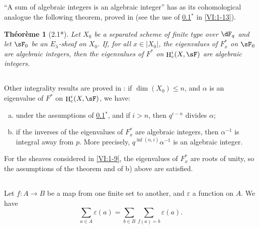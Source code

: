 \documentclass[oneside]{book}
\DeclareMathOperator{\h}{H}
\theoremstyle{sga-source}
\theoremstyle{sga-source-dash}
\theoremstyle{sga-source-dotdash}
\theoremstyle{sga-source-number-note-dash}
\theoremstyle{sga-source-note-number-dotdash}
\theoremstyle{sga-source-example-dotdash}
\theoremstyle{sga-source-inline-number}
\theoremstyle{sga-source-bare-number}
\theoremstyle{sga-source}
\newtheorem*{theorem*}{Théorème}
\begin{document}
\subsection{}\label{VI:2-1}

``A sum of algebraic integers is an algebraic integer'' has as its 
cohomological analogue the following theorem, proved in 
\cite[XXI 5.2.2]{sga7} (see the use of \ref{VI:2-1}$^\ast$ in 
\ref{VI:1-13}). 





\begin{theorem*}[2.1*]\label{VI:2-1*}
Let $X_0$ be a separated scheme of finite type over $\dF_q$ and let $\sF_0$ be an 
$E_\lambda$-sheaf on $X_0$. If, for all $x\in |X_0|$, the 
eigenvalues of $F_x^\ast$ on $\sF_0$ are algebraic integers, then the 
eigenvalues of $F^\ast$ on $\h_c^i(X,\sF)$ are algebraic integers. 
\end{theorem*}





\subsection{}\label{VI:2-2}

Other integrality results are proved in 
\cite[XXI, 5.2.2 et 5.4]{sga7}: if $\dim(X_0)\leqslant n$, and $\alpha$ is 
an eigenvalue of $F^\ast$ on $\h_c^i(X,\sF)$, we have: 
\begin{enumerate}[a)]
  \item under the assumptions of \ref{VI:2-1}$^\ast$, and if $i>n$, then 
    $q^{i-n}$ divides $\alpha$;
  \item if the inverses of the eigenvalues of $F_x^\ast$ are algebraic 
    integers, then $\alpha^{-1}$ is integral away from $p$. More 
    precisely, $q^{\inf(n,i)}\alpha^{-1}$ is an algebraic integer. 
\end{enumerate}

For the sheaves considered in \ref{VI:1-9}, the eigenvalues of 
$F_x^\ast$ are roots of unity, so the assumptions of 
the theorem and of b) above are satisfied. 





\subsection{}\label{VI:2-3}

Let $f:A\to B$ be a map from one finite set to another, and 
$\varepsilon$ a function on $A$. We have 
\begin{equation*}\tag{2.3.1}\label{VI:eq:2-3-1}
  \sum_{a\in A} \varepsilon(a) = \sum_{b\in B} \sum_{f(a)=b} \varepsilon(a) \text{.}
\end{equation*}
\end{document}
